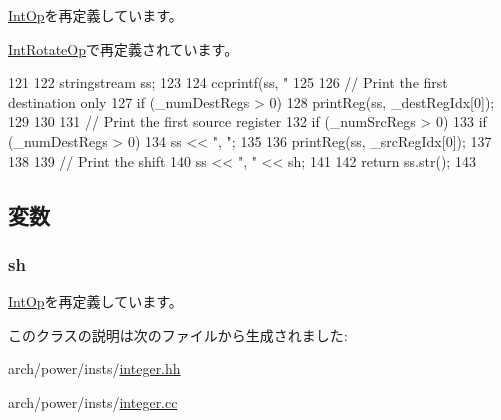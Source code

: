 \hyperlink{classPowerISA_1_1IntOp_a3134956ec18bb095818e06eb988f6c55}{IntOp}を再定義しています。

\hyperlink{classPowerISA_1_1IntRotateOp_a3134956ec18bb095818e06eb988f6c55}{IntRotateOp}で再定義されています。


\begin{DoxyCode}
121 {
122     stringstream ss;
123 
124     ccprintf(ss, "%
125 
126     // Print the first destination only
127     if (_numDestRegs > 0) {
128         printReg(ss, _destRegIdx[0]);
129     }
130 
131     // Print the first source register
132     if (_numSrcRegs > 0) {
133         if (_numDestRegs > 0) {
134             ss << ", ";
135         }
136         printReg(ss, _srcRegIdx[0]);
137     }
138 
139     // Print the shift
140     ss << ", " << sh;
141 
142     return ss.str();
143 }
\end{DoxyCode}


\subsection{変数}
\hypertarget{classPowerISA_1_1IntShiftOp_a2b6cd065d4330a52705b9237b1062c6a}{
\subsubsection[{sh}]{ {\bf sh}}}
\label{classPowerISA_1_1IntShiftOp_a2b6cd065d4330a52705b9237b1062c6a}


\hyperlink{classPowerISA_1_1IntOp_a2b6cd065d4330a52705b9237b1062c6a}{IntOp}を再定義しています。

このクラスの説明は次のファイルから生成されました:\begin{DoxyCompactItemize}
\item 
arch/power/insts/\hyperlink{integer_8hh}{integer.hh}\item 
arch/power/insts/\hyperlink{integer_8cc}{integer.cc}\end{DoxyCompactItemize}
